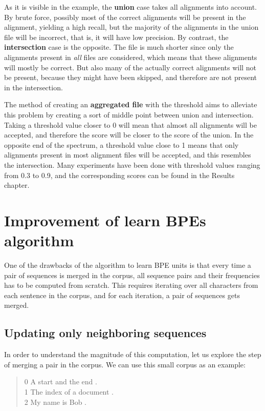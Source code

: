 As it is visible in the example, the \textbf{union} case takes all alignments into account. By brute force, possibly most of the correct alignments will be present in the alignment, yielding a high recall, but the majority of the alignments in the union file will be incorrect, that is, it will have low precision. By contrast, the \textbf{intersection} case is the opposite. The file is much shorter since only the alignments present in \emph{all} files are considered, which means that these alignments will mostly be correct. But also many of the actually correct alignments will not be present, because they might have been skipped, and therefore are not present in the intersection.

The method of creating an \textbf{aggregated file} with the threshold aims to alleviate this problem by creating a sort of middle point between union and intersection. Taking a threshold value closer to 0 will mean that almost all alignments will be accepted, and therefore the score will be closer to the score of the union. In the opposite end of the spectrum, a threshold value close to 1 means that only alignments present in most alignment files will be accepted, and this resembles the intersection. Many experiments have been done with threshold values ranging from 0.3 to 0.9, and the corresponding scores can be found in the Results chapter.

\section{Improvement of learn BPEs algorithm}\label{sec:improvlearnbpe}

One of the drawbacks of the algorithm to learn BPE units is that every time a pair of sequences is merged in the corpus, all sequence pairs and their frequencies has to be computed from scratch. This requires iterating over all characters from each sentence in the corpus, and for each iteration, a pair of sequences gets merged.

\subsection{Updating only neighboring sequences}

In order to understand the magnitude of this computation, let us explore the step of merging a pair in the corpus. We can use this small corpus as an example:

\begin{quote}
	0	A start and the end .\\
	1 	The index of a document .\\
	2 	My name is Bob .
\end{quote}

